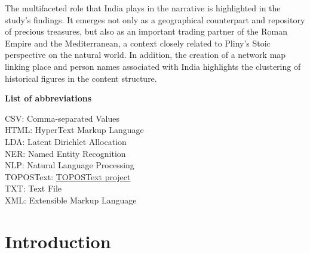 \documentclass[
  12pt,
]{article}
\renewcommand*\contentsname{Table of contents}
\newcommand\contentsname{Table of contents}
\begin{document}
The multifaceted role that India plays in the narrative is highlighted in the study's findings. It emerges not only as a geographical counterpart and repository of precious treasures, but also as an important trading partner of the Roman Empire and the Mediterranean, a context closely related to Pliny's Stoic perspective on the natural world. In addition, the creation of a network map linking place and person names associated with India highlights the clustering of historical figures in the content structure.

\newpage


\raggedright

\Large\textbf{List of abbreviations}   

\vspace*{\baselineskip}
\normalsize
CSV: Comma-separated Values\\
\medskip
HTML: HyperText Markup Language\\
\medskip
LDA: Latent Dirichlet Allocation\\
\medskip
NER: Named Entity Recognition\\
\medskip
NLP: Natural Language Processing \\
\medskip
TOPOSText: \href{https://topostext.org/}{TOPOSText project} \\
\medskip
TXT: Text File\\
\medskip
XML: Extensible Markup Language\\

\newpage

\normalsize
\justifying\ifdefined\Shaded\renewenvironment{Shaded}{\begin{tcolorbox}[breakable, interior hidden, boxrule=0pt, borderline west={3pt}{0pt}{shadecolor}, enhanced, sharp corners, frame hidden]}{\end{tcolorbox}}\fi

\renewcommand*\contentsname{Table of Contents}
{
\hypersetup{linkcolor=}
\setcounter{tocdepth}{3}
\tableofcontents
}
\clearpage
\listoffigures
\listoftables
{}
\clearpage
\pagestyle{plain}
\setcounter{page}{1}

\hypertarget{sec-introduction}{%
\section{Introduction}\label{sec-introduction}}
\end{document}
